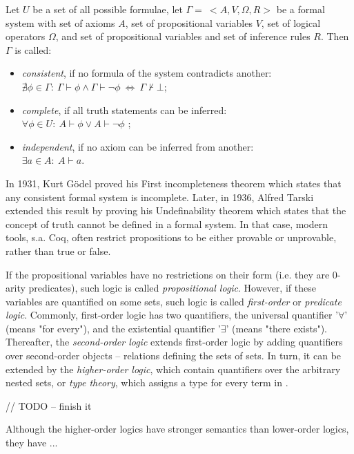 \documentclass[article]{aaltoseries}
\begin{document}
Let $U$ be a set of all possible formulae, let $\Gamma = \ <A, V, \Omega, R>$ be a formal system with set of axioms $A$, set of propositional variables $V$, set of logical operators $\Omega$, and set of propositional variables and set of inference rules $R$. Then $\Gamma$ is called:
\begin{itemize}
	\itemsep0em
	\item \textit{consistent}, if no formula of the system contradicts another: \\
		$\nexists \phi \in \Gamma: \ \Gamma \vdash \phi \land \Gamma \vdash \neg \phi  \ \Leftrightarrow \ \Gamma \nvdash \bot$;
	\item \textit{complete}, if all truth statements can be inferred: \\
		$\forall \phi \in U: \ A \vdash \phi \lor A \vdash \neg \phi$ ;
	\item \textit{independent}, if no axiom can be inferred from another: \\
		$\exists a \in A: \ A \vdash a$.
\end{itemize}

In 1931, Kurt Gödel proved his First incompleteness theorem which states that any consistent formal system is incomplete. Later, in 1936, Alfred Tarski extended this result by proving his Undefinability theorem which states that the concept of truth cannot be defined in a formal system. %
In that case, modern tools, s.a. Coq, often restrict propositions to be either provable or unprovable, rather than true or false.

If the propositional variables have no restrictions on their form (i.e. they are 0-arity predicates), such logic is called \textit{propositional logic}. However, if these variables are quantified on some sets, such logic is called \textit{first-order} or \textit{predicate logic}. Commonly, first-order logic has two quantifiers, the universal quantifier '$\forall$' (means "for every"), and the existential quantifier '$\exists$' (means "there exists"). Thereafter, the \textit{second-order logic} extends first-order logic by adding quantifiers over second-order objects -- relations defining the sets of sets. In turn, it can be extended by the \textit{higher-order logic}, which contain quantifiers over the arbitrary nested sets, or \textit{type theory}, which assigns a type for every term in .

// TODO -- finish it

Although the higher-order logics have stronger semantics than lower-order logics, they have ...
\end{document}
